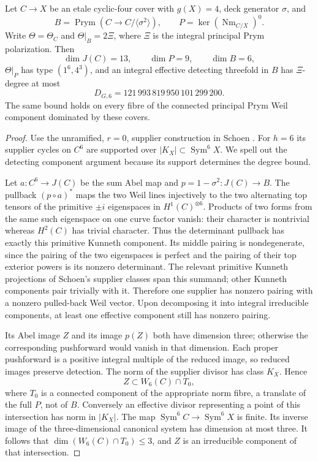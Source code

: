 \begin{theorem}
\label{SF-03}
Let $C\to X$ be an etale cyclic-four cover with $g(X)=4$, deck
generator $\sigma$, and
\[
 B=\operatorname{Prym}(C\to C/\langle\sigma^2\rangle),\qquad
 P=\ker(\operatorname{Nm}_{C/X})^0.
\]
Write $\Theta=\Theta_C$ and $\Theta|_B=2\Xi$, where $\Xi$ is the
integral principal Prym polarization. Then
\[
 \dim J(C)=13,\qquad \dim P=9,\qquad\dim B=6,
\]
$\Theta|_P$ has type $(1^6,4^3)$, and an integral effective detecting
threefold in $B$ has $\Xi$-degree at most
\[
 D_{G,6}=121\,993\,819\,950\,101\,299\,200.
\]
The same bound holds on every fibre of the connected principal Prym
Weil component dominated by these covers.
\end{theorem}
\begin{proof}
Use the unramified, $r=0$, supplier construction in Schoen
\cite[Theorem~2.0, pp.~12--13, Lemma~2.6, and \S3, pp.~24--25]{SF-Schoen1988}.
For $h=6$ its supplier cycles on $C^6$ are supported over
$|K_X|\subset\operatorname{Sym}^6X$. We spell out the detecting
component argument because its support determines the degree bound.

Let $a:C^6\to J(C)$ be the sum Abel map and $p=1-\sigma^2:J(C)\to B$.
The pullback $(p\circ a)^*$ maps the two Weil lines injectively to the
two alternating top tensors of the primitive $\pm i$ eigenspaces in
$H^1(C)^{\otimes6}$. Products of two forms from the same such
eigenspace on one curve factor vanish: their character is nontrivial
whereas $H^2(C)$ has trivial character. Thus the determinant pullback
has exactly this primitive Kunneth component. Its middle pairing is
nondegenerate, since the pairing of the two eigenspaces is perfect
and the pairing of their top exterior powers is its nonzero
determinant. The relevant primitive Kunneth projections of Schoen's
supplier classes span this summand; other Kunneth components pair
trivially with it. Therefore one supplier has nonzero pairing with a
nonzero pulled-back Weil vector. Upon decomposing it into integral
irreducible components, at least one effective component still has
nonzero pairing.

Its Abel image $Z$ and its image $p(Z)$ both have dimension three;
otherwise the corresponding pushforward would vanish in that
dimension. Each proper pushforward is a positive integral multiple
of the reduced image, so reduced images preserve detection. The norm
of the supplier divisor has class $K_X$. Hence
\[
 Z\subset W_6(C)\cap T_0,
\]
where $T_0$ is a connected component of the appropriate norm fibre,
a translate of the full $P$, not of $B$. Conversely an effective
divisor representing a point of this intersection has norm in
$|K_X|$. The map $\operatorname{Sym}^6C\to\operatorname{Sym}^6X$ is
finite. Its inverse image of the three-dimensional canonical system
has dimension at most three. It follows that
$\dim(W_6(C)\cap T_0)\le3$, and $Z$ is an irreducible component of
that intersection.


\end{proof}
